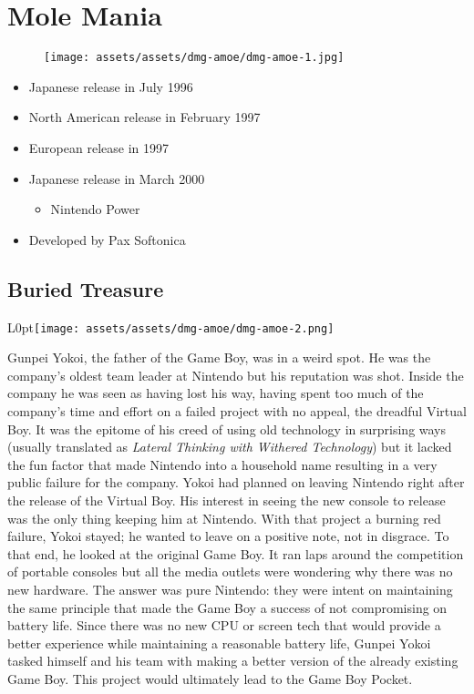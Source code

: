 \documentclass{book}
\begin{document}
\chapter*{Mole Mania}
\vspace{\baselineskip}\begin{figure}[H]{\texttt{[image: assets/assets/dmg-amoe/dmg-amoe-1.jpg]}}\end{figure}\vspace{\baselineskip}
\begin{itemize}[left=0pt, nosep]
\item Japanese release in July 1996
\item North American release in February 1997
\item European release in 1997
\item Japanese release in March 2000
\begin{itemize}
\item Nintendo Power
\end{itemize}
\item Developed by Pax Softonica

\end{itemize}
\newpage\FloatBarrier\section*{Buried Treasure}
\begin{wrapfigure}{L}{0pt}{\texttt{[image: assets/assets/dmg-amoe/dmg-amoe-2.png]}}\end{wrapfigure}\noindent
Gunpei Yokoi, the father of the Game Boy, was in a weird spot. He was the company’s oldest team leader at Nintendo but his reputation was shot. Inside the company he was seen as having lost his way, having spent too much of the company’s time and effort on a failed project with no appeal, the dreadful Virtual Boy. It was the epitome of his creed of using old technology in surprising ways (usually translated as \emph{Lateral Thinking with Withered Technology}) but it lacked the fun factor that made Nintendo into a household name resulting in a very public failure for the company. Yokoi had planned on leaving Nintendo right after the release of the Virtual Boy. His interest in seeing the new console to release was the only thing keeping him at Nintendo. With that project a burning red failure, Yokoi stayed; he wanted to leave on a positive note, not in disgrace. To that end, he looked at the original Game Boy. It ran laps around the competition of portable consoles but all the media outlets were wondering why there was no new hardware. The answer was pure Nintendo: they were intent on maintaining the same principle that made the Game Boy a success of not compromising on battery life. Since there was no new CPU or screen tech that would provide a better experience while maintaining a reasonable battery life, Gunpei Yokoi tasked himself and his team with making a better version of the already existing Game Boy. This project would ultimately lead to the Game Boy Pocket.\par
\end{document}
